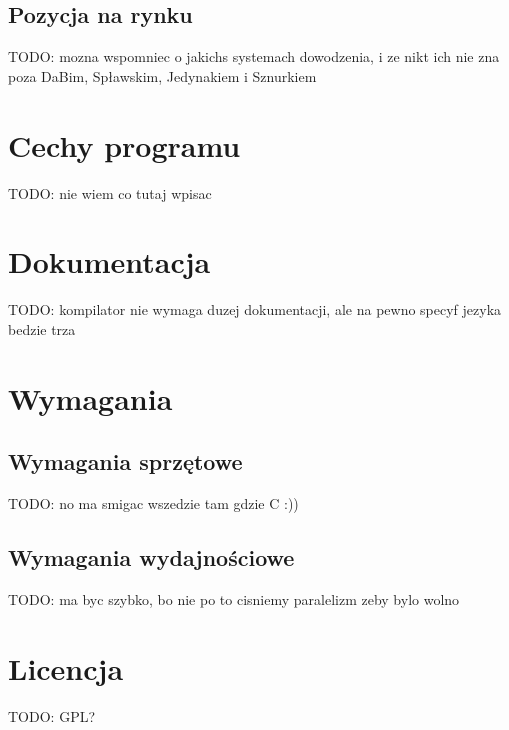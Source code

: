 \documentclass{documentation}
\begin{document}
\subsection{Pozycja na rynku}
TODO: mozna wspomniec o jakichs systemach dowodzenia, i ze nikt ich nie zna poza DaBim, Spławskim, Jedynakiem i Sznurkiem

\section{Cechy programu}
TODO: nie wiem co tutaj wpisac

\section{Dokumentacja}
TODO: kompilator nie wymaga duzej dokumentacji, ale na pewno specyf jezyka bedzie trza

\section{Wymagania}
\subsection{Wymagania sprzętowe}
TODO: no ma smigac wszedzie tam gdzie C :))

\subsection{Wymagania wydajnościowe}
TODO: ma byc szybko, bo nie po to cisniemy paralelizm zeby bylo wolno

\section{Licencja}
TODO: GPL?
\end{document}
